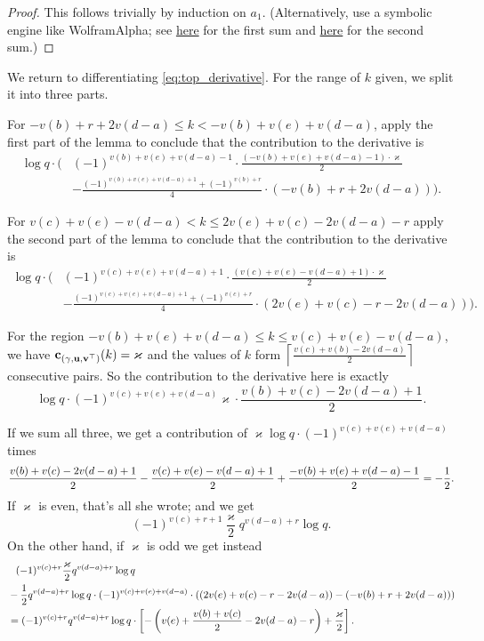 \begin{proof}
  This follows trivially by induction on $a_1$.
  (Alternatively, use a symbolic engine like WolframAlpha;
  see
  \href{https://www.wolframalpha.com/input?i=sum+\%28k-a\%29*k*\%28-1\%29\%5Ek+from+k\%3Da+to+b}{here}
  for the first sum and
  \href{https://www.wolframalpha.com/input?i=sum+\%28b-k\%29*k*\%28-1\%29\%5Ek+from+k\%3Da+to+b}{here}
  for the second sum.)
\end{proof}
We return to differentiating \eqref{eq:top_derivative}.
For the range of $k$ given, we split it into three parts.
\begin{itemize}
  \ii For $-v(b) + r + 2v(d-a) \le k < -v(b) + v(e) + v(d-a)$,
  apply the first part of the lemma to conclude that the contribution to the derivative is
  \begin{align*}
    \log q \cdot \Big( & (-1)^{v(b)+v(e)+v(d-a)-1} \cdot
      \frac{(-v(b)+v(e)+v(d-a)-1) \cdot \varkappa}{2} \\
      &
      - \frac{(-1)^{v(b)+v(e)+v(d-a)+1} + (-1)^{v(b)+r}}{4} \cdot (-v(b) + r + 2v(d-a))
    \Big).
  \end{align*}

  \ii For $v(c)+v(e)-v(d-a) < k \le 2v(e)+v(c)-2v(d-a)-r$
  apply the second part of the lemma to conclude that the contribution to the derivative is
  \begin{align*}
    \log q \cdot \Big( & (-1)^{v(c)+v(e)+v(d-a)+1} \cdot
      \frac{(v(c)+v(e)-v(d-a)+1) \cdot \varkappa}{2} \\
      &
      - \frac{(-1)^{v(c)+v(e)+v(d-a)+1} + (-1)^{v(c)+r}}{4} \cdot (2v(e)+v(c)-r-2v(d-a))
    \Big).
  \end{align*}

  \ii For the region $-v(b)+v(e)+v(d-a) \le k \le v(c)+v(e)-v(d-a)$,
  we have $\mathbf c_{{(\gamma, \mathbf u, \mathbf v^\top)}}(k) = \varkappa$
  and the values of $k$ form $\left\lceil \frac{v(c)+v(b)-2v(d-a)}{2} \right\rceil$ consecutive pairs.
  So the contribution to the derivative here is exactly
  \[ \log q \cdot (-1)^{v(c)+v(e)+v(d-a)} \varkappa \cdot \frac{v(b)+v(c)-2v(d-a)+1}{2}. \]
\end{itemize}
If we sum all three,
we get a contribution of $\varkappa \log q \cdot  (-1)^{v(c)+v(e)+v(d-a)}$ times
\[ \frac{v(b)+v(c)-2v(d-a)+1}{2} - \frac{v(c)+v(e)-v(d-a)+1}{2} + \frac{-v(b)+v(e)+v(d-a)-1}{2}
  = -\frac{1}{2}. \]
If $\varkappa$ is even, that's all she wrote; and we get
\[ (-1)^{v(c)+r+1} \frac{\varkappa}{2} q^{v(d-a)+r} \log q. \]
On the other hand, if $\varkappa$ is odd we get instead
\begin{align*}
  &\phantom+ (-1)^{v(c)+r} \frac{\varkappa}{2} q^{v(d-a)+r} \log q \\
  &- \half q^{v(d-a)+r} \log q \cdot (-1)^{v(c)+v(e)+v(d-a)} \cdot
  \left( \left( 2v(e)+v(c)-r-2v(d-a)\right) - \left( -v(b)+r+2v(d-a) \right) \right) \\
  &= (-1)^{v(c)+r} q^{v(d-a)+r} \log q \cdot \left[
    -\left( v(e)+\frac{v(b)+v(c)}{2}-2v(d-a)-r \right) + \frac{\varkappa}{2} \right].
\end{align*}
